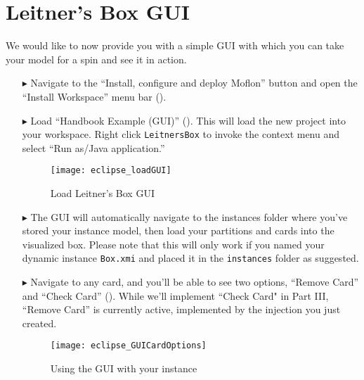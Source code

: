 \newpage
\section{Leitner's Box GUI}
\genHeader

We would like to now provide you with a simple GUI with which you can take your model for a spin and see it in action.

\begin{itemize}

\item[$\blacktriangleright$] Navigate to the ``Install, configure and deploy Moflon'' button and open the ``Install Workspace'' menu bar ().

\item[$\blacktriangleright$] Load ``Handbook Example (GUI)'' (). This will load the new project into your workspace. Right click \texttt{LeitnersBox} to invoke the context menu and select ``Run as/Java application.''

\begin{figure}[htbp]
    \centering
    \texttt{[image: eclipse\_loadGUI]}
    \caption{Load Leitner's Box GUI}
    \label{eclipse:GUI_load}
\end{figure}


\item[$\blacktriangleright$] The GUI will automatically navigate to the instances folder where you've stored your instance model, then load your partitions and
cards into the visualized box. Please note that this will only work if you named your dynamic instance \texttt{Box.xmi} and placed it in the \texttt{instances}
folder as suggested.

\vspace{0.5cm}

\item[$\blacktriangleright$] Navigate to any card, and you'll be able to see two options, ``Remove Card'' and ``Check Card''
(). While we'll implement ``Check Card" in Part III, ``Remove Card'' is currently active, implemented by the injection you
just created.

\vspace{1cm}

\begin{figure}[htbp]
    \centering
    \texttt{[image: eclipse\_GUICardOptions]}
    \caption{Using the GUI with your instance}
    \label{eclipse:GUI_cardOptions}
\end{figure}


\end{itemize}
